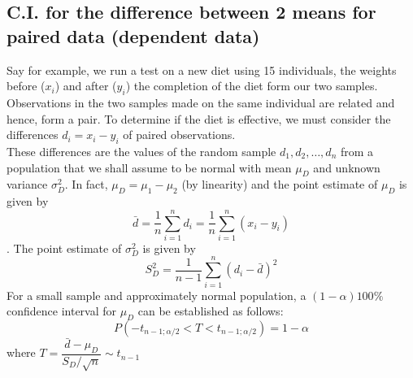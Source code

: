 
\subsection{C.I. for the difference between 2 means for paired data (dependent data)}
Say for example, we run a test on a new diet using 15 individuals, the weights before ($x_i$) and after ($y_i$) the completion of the diet form our two samples. Observations in the two samples made on the same individual are related and hence, form a pair. To determine if the diet is effective, we must consider the differences $d_i = x_i - y_i$ of paired observations. \\
These differences are the values of the random sample $d_1, d_2, \dots, d_n$ from a population that we shall assume to be normal with mean $\mu_D$ and unknown variance $\sigma_D^2$. In fact, $\mu_D  = \mu_1 - \mu_2$ (by linearity) and the point estimate of $\mu_D$ is given by 
$$
\bar{d} = \dfrac{1}{n} \sum_{i = 1}^n d_i = \dfrac{1}{n} \sum_{i = 1}^n (x_i - y_i)
$$. 
The point estimate of $\sigma_D^2$ is given by 
$$
S_D^2 = \dfrac{1}{n - 1} \sum_{i = 1}^n (d_i - \bar{d})^2
$$
For a small sample and approximately normal population, a $(1 - \alpha)100\%$ confidence interval for $\mu_D$ can be established as follows:
$$
P(-t_{n - 1; \alpha/2} < T < t_{n - 1; \alpha/2}) = 1 - \alpha
$$ where $T = \dfrac{\bar{d} - \mu_D}{S_D / \sqrt{n}} \sim t_{n -1}$\\

